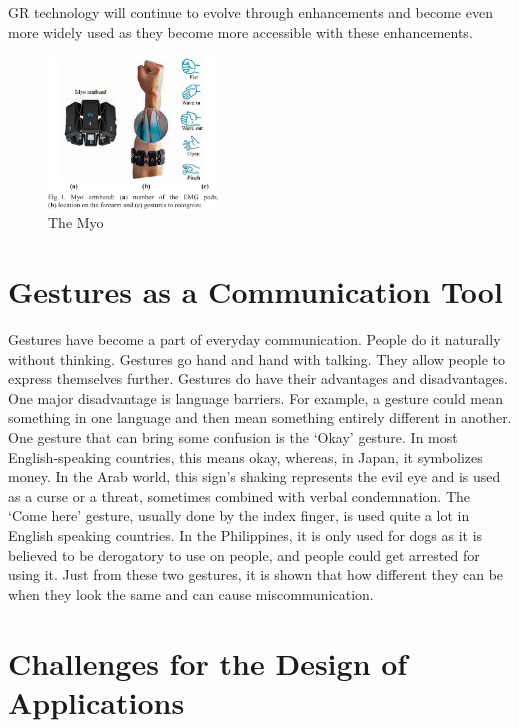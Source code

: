 \documentclass{article}
\begin{document}
GR technology will continue to evolve through enhancements and become even more widely used as they become more accessible with these enhancements.

\begin{figure}[!ht]
    \caption{The Myo}
    \label{image:MYO}
    \centering
    \includegraphics[width=0.4\textwidth]{pics/myo.png}
\end{figure}

\newpage
\section{Gestures as a Communication Tool}

Gestures have become a part of everyday communication. People do it naturally without thinking. Gestures go hand and hand with talking. They allow people to express themselves further.
Gestures do have their advantages and disadvantages. One major disadvantage is language barriers. For example, a gesture could mean something in one language and then mean something entirely different in another. One gesture that can bring some confusion is the ‘Okay’ gesture. In most English-speaking countries, this means okay, whereas, in Japan, it symbolizes money. In the Arab world, this sign’s shaking represents the evil eye and is used as a curse or a threat, sometimes combined with verbal condemnation. The ‘Come here’ gesture, usually done by the index finger, is used quite a lot in English speaking countries. In the Philippines, it is only used for dogs as it is believed to be derogatory to use on people, and people could get arrested for using it. Just from these two gestures, it is shown that how different they can be when they look the same and can cause miscommunication.
\cite{ref14}

\section{Challenges for the Design of Applications}
\end{document}
